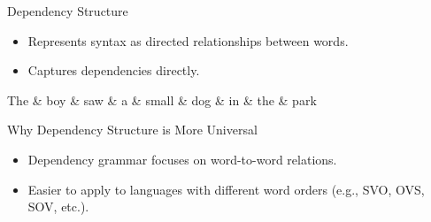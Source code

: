 \documentclass{beamer}
\begin{document}
\begin{frame}{Dependency Structure}
    \begin{itemize}
        \item Represents syntax as directed relationships between words.
        \item Captures dependencies directly.
    \end{itemize}
    \begin{dependency}[theme=night]
        \begin{deptext}
            The \& boy \& saw \& a \& small \& dog \& in \& the \& park \\
        \end{deptext}
    \end{dependency}
\end{frame}

\begin{frame}{Why Dependency Structure is More Universal}
    \begin{itemize}
        \item Dependency grammar focuses on word-to-word relations.
        \item Easier to apply to languages with different word orders (e.g., SVO, OVS, SOV, etc.).
    \end{itemize}
\end{frame}
\end{document}
